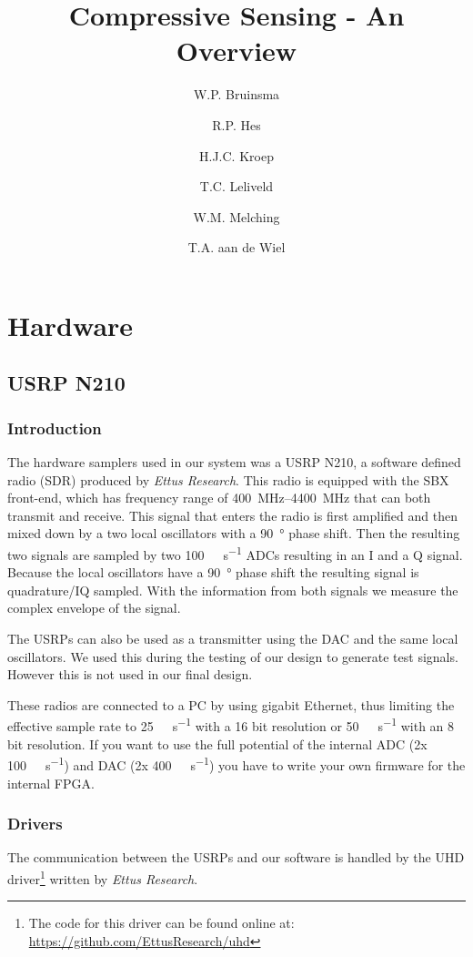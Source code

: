 \documentclass[a4paper, openany, oneside]{memoir}
\title{Compressive Sensing - An Overview}
\author{W.P. Bruinsma \and R.P. Hes \and H.J.C. Kroep \and T.C. Leliveld \and W.M. Melching \and T.A. aan de Wiel}
\begin{document}
\chapter{Hardware}

\section{USRP N210}
\label{sec:usrp-n210}

\subsection{Introduction}
The hardware samplers used in our system was a USRP N210, a software defined radio (SDR) produced by \textit{Ettus Research}. This radio is equipped with the SBX front-end, which has frequency range of \SIrange{400}{4400}{\mega\hertz} that can both transmit and receive. This signal that enters the radio is first amplified and then mixed down by a two local oscillators with a \SI{90}{\degree} phase shift. Then the resulting two signals are sampled by two \SI{100}{\mega\sample\per\second} ADCs resulting in an I and a Q signal. Because the local oscillators have a \SI{90}{\degree} phase shift the resulting signal is quadrature/IQ sampled. With the information from both signals we measure the complex envelope of the signal.

The USRPs can also be used as a transmitter using the DAC and the same local oscillators. We used this during the testing of our design to generate test signals. However this is not used in our final design.

These radios are connected to a PC by using gigabit Ethernet, thus limiting the effective sample rate to \SI{25}{\mega\sample\per\second} with a 16 bit resolution or \SI{50}{\mega\sample\per\second} with an 8 bit resolution. If you want to use the full potential of the internal ADC (2x \SI{100}{\mega\sample\per\second}) and DAC (2x \SI{400}{\mega\sample\per\second}) you have to write your own firmware for the internal FPGA.

\subsection{Drivers}
\label{sec:drivers}
The communication between the USRPs and our software is handled by the UHD driver\footnote{The code for this driver can be found online at: \url{https://github.com/EttusResearch/uhd}} written by \textit{Ettus Research}.
\end{document}

